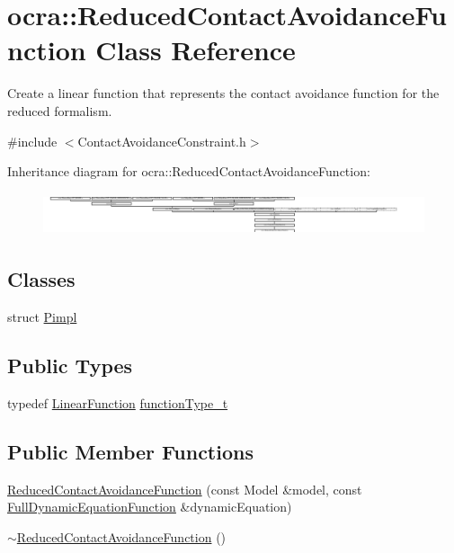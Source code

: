 \hypertarget{classocra_1_1ReducedContactAvoidanceFunction}{}\section{ocra\+:\+:Reduced\+Contact\+Avoidance\+Function Class Reference}
\label{classocra_1_1ReducedContactAvoidanceFunction}


Create a linear function that represents the contact avoidance function for the reduced formalism.  




{\ttfamily \#include $<$Contact\+Avoidance\+Constraint.\+h$>$}

Inheritance diagram for ocra\+:\+:Reduced\+Contact\+Avoidance\+Function\+:\begin{figure}[H]
\begin{center}
\leavevmode
\includegraphics[height=1.262480cm]{db/d40/classocra_1_1ReducedContactAvoidanceFunction}
\end{center}
\end{figure}
\subsection*{Classes}
\begin{DoxyCompactItemize}
\item 
struct \hyperlink{structReducedContactAvoidanceFunction_1_1Pimpl}{Pimpl}
\end{DoxyCompactItemize}
\subsection*{Public Types}
\begin{DoxyCompactItemize}
\item 
typedef \hyperlink{classocra_1_1LinearFunction}{Linear\+Function} \hyperlink{classocra_1_1ReducedContactAvoidanceFunction_ae1d0c9b1c213515eabdb15cb7dc82869}{function\+Type\+\_\+t}
\end{DoxyCompactItemize}
\subsection*{Public Member Functions}
\begin{DoxyCompactItemize}
\item 
\hyperlink{classocra_1_1ReducedContactAvoidanceFunction_ae2183d53a13985590ee4f5cf59083803}{Reduced\+Contact\+Avoidance\+Function} (const Model \&model, const \hyperlink{classocra_1_1FullDynamicEquationFunction}{Full\+Dynamic\+Equation\+Function} \&dynamic\+Equation)
\item 
\hyperlink{classocra_1_1ReducedContactAvoidanceFunction_a7a1844143947f714f2e0207d9f56834a}{$\sim$\+Reduced\+Contact\+Avoidance\+Function} ()
\end{DoxyCompactItemize}
